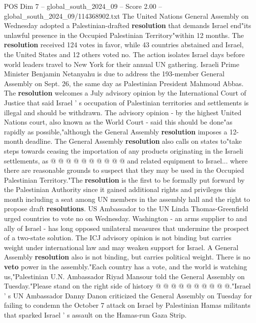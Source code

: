 \begin{textsample}{POS Dim 7 – global\_south\_2024\_09 – Score 2.00 – global\_south\_2024\_09/114368902.txt}  \label{ex:f7_pos_276}
The United Nations General Assembly on Wednesday adopted a Palestinian-drafted \textbf{resolution} that demands Israel end"its unlawful presence in the Occupied Palestinian Territory"within 12 months.
The \textbf{resolution} received 124 votes in favor, while 43 countries abstained and Israel, the United States and 12 others voted no.
The action isolates Israel days before world leaders travel to New York for their annual UN gathering.
Israeli Prime Minister Benjamin Netanyahu is due to address the 193-member General Assembly on Sept. 26, the same day as Palestinian President Mahmoud Abbas.
The \textbf{resolution} welcomes a July advisory opinion by the International Court of Justice that said Israel ' s occupation of Palestinian territories and settlements is illegal and should be withdrawn.
The advisory opinion - by the highest United Nations court, also known as the World Court - said this should be done"as rapidly as possible,"although the General Assembly \textbf{resolution} imposes a 12-month deadline.
The General Assembly \textbf{resolution} also calls on states to"take steps towards ceasing the importation of any products originating in the Israeli settlements, as @ @ @ @ @ @ @ @ @ @ and related equipment to Israel... where there are reasonable grounds to suspect that they may be used in the Occupied Palestinian Territory."The \textbf{resolution} is the first to be formally put forward by the Palestinian Authority since it gained additional rights and privileges this month including a seat among UN members in the assembly hall and the right to propose draft \textbf{resolutions}.
US Ambassador to the UN Linda Thomas-Greenfield urged countries to vote no on Wednesday.
Washington - an arms supplier to and ally of Israel - has long opposed unilateral measures that undermine the prospect of a two-state solution.
The ICJ advisory opinion is not binding but carries weight under international law and may weaken support for Israel.
A General Assembly \textbf{resolution} also is not binding, but carries political weight.
There is no \textbf{veto} power in the assembly."Each country has a vote, and the world is watching us,"Palestinian U.N.
Ambassador Riyad Mansour told the General Assembly on Tuesday."Please stand on the right side of history @ @ @ @ @ @ @ @ @ @."Israel ' s UN Ambassador Danny Danon criticized the General Assembly on Tuesday for failing to condemn the October 7 attack on Israel by Palestinian Hamas militants that sparked Israel ' s assault on the Hamas-run Gaza Strip.

\end{textsample}
